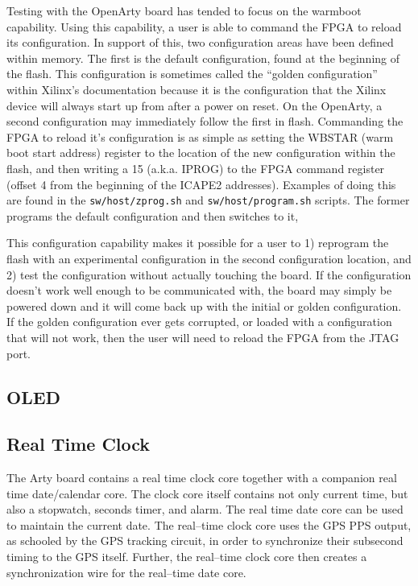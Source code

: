 \documentclass{gqtekspec}
\begin{document}
Testing with the OpenArty board has tended to focus on the warmboot capability.
Using this capability, a user is able to command the FPGA to reload its
configuration.  In support of this, two configuration areas have been 
defined within memory.  The first is the default configuration, found at
the beginning of the flash.  This configuration is sometimes called the ``golden
configuration'' within Xilinx's documentation because it is the configuration
that the Xilinx device will always start up from after a power on reset.  On
the OpenArty, a second configuration may immediately follow the first in flash. 
Commanding the FPGA to reload it's configuration is as simple as
setting the WBSTAR (warm boot start address) register to the location of the
new configuration within the flash, and then writing a 15 (a.k.a. IPROG)
to the FPGA command register (offset 4 from the beginning of the ICAPE2
addresses).  Examples of doing this are found in the 
{\tt sw/host/zprog.sh} and {\tt sw/host/program.sh} scripts.  The former
programs the default configuration and then switches to it, 

This configuration capability makes it possible for a user to 1) reprogram
the flash with an experimental configuration in the second configuration
location, and 2) test the configuration without actually touching the board. 
If the configuration doesn't work well enough to be communicated with, the
board may simply be powered down and it will come back up with the initial
or golden configuration.  If the golden configuration ever gets corrupted,
or loaded with a configuration that will not work, then the user will need to
reload the FPGA from the JTAG port.

\subsection{OLED}
\subsection{Real Time Clock}

The Arty board contains a real time clock core together with a companion
real time date/calendar core.  The clock core itself contains not only current
time, but also a stopwatch, seconds timer, and alarm.  The real time date core
can be used to maintain the current date.  The real--time clock core uses the
GPS PPS output, as schooled by the GPS tracking circuit, in order to synchronize
their subsecond timing to the GPS itself.  Further, the real--time clock core
then creates a synchronization wire for the real--time date core.
\end{document}

